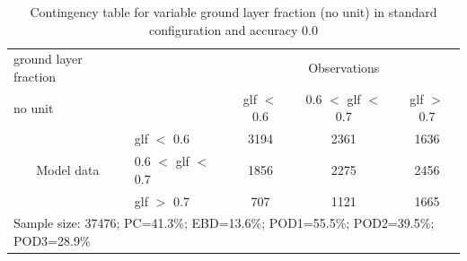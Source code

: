 \begin{table}[]
\begin{center}
\begin{tabular}{llccc}
\hline
{ground layer fraction}                                       &                                                    & \multicolumn{3}{c}{Observations}                 \\
{no unit}                                       &                             & glf $<$ 0.6   & 0.6 $<$ glf $<$ 0.7 & glf $>$ 0.7 \\
\hline
\multicolumn{1}{c}{\multirow{3}{*}{Model data}}  & glf $<$ 0.6             & 3194                & 2361                       & 1636              \\
                                                 & 0.6  $<$ glf $<$ 0.7 & 1856                & 2275                       & 2456              \\
                                                 & glf $>$ 0.7             & 707                & 1121                       & 1665              \\
\hline
\multicolumn{5}{l}{Sample size: 37476; PC=41.3\%; EBD=13.6\%; POD1=55.5\%; POD2=39.5\%; POD3=28.9\%}
\end{tabular}
\end{center}
\caption{Contingency table for variable ground layer fraction (no unit) in standard configuration and accuracy 0.0}
\label{tab:contingencyglfBEF}
\end{table}
